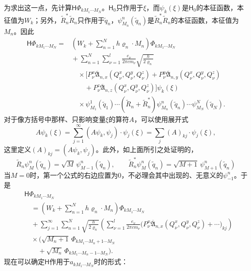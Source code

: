 \documentclass[fontsize=13pt,twoside,openany,headings=normal,parskip=false,bookmarkpackage=false,DIV=calc]{scrbook}
\begin{document}
为求出这一点，先计算$\mathsf{H}\Phi_{kM_1\cdots M_N}$。$\mathsf{H}_0$只作用于$\xi$，而$\psi_k(\xi)$是$\mathsf{H}_0$的本征函数，本征值为$W_k$；另外，$\widetilde R_n^*\widetilde R_n$只作用于$\widetilde q_n$，$\psi_{M_n}^n(\widetilde q_n)$是$\widetilde R_n^*\widetilde R_n$的本征函数，本征值为$M_n$。\hypertarget{origpage-143}{}\label{origpage-143}因此
\begin{align*}
 \mathsf{H}\Phi_{kM_1\cdots M_N}
 ={}&\left(W_k+\sum_{n=1}^{N}h\varrho_n\cdot M_n\right)\Phi_{kM_1\cdots M_N}\\
 &{}+\sum_{n=1}^{N}\sum_{\nu=1}^{l}\frac{e_\nu}{2\pi cm_\nu}\sqrt{\frac h{2\varrho_n}}\\
 &\quad{}\times\bigl[P_\nu^x\overline{\mathfrak A}_{n,x}(Q_\nu^x,Q_\nu^y,Q_\nu^z)
 +P_\nu^y\overline{\mathfrak A}_{n,y}(Q_\nu^x,Q_\nu^y,Q_\nu^z)\\
 &\qquad{}+P_\nu^z\overline{\mathfrak A}_{n,z}(Q_\nu^x,Q_\nu^y,Q_\nu^z)\bigr]\psi_k(\xi)\\
 &\quad{}\times\psi_{M_1}^1(\widetilde q_1)\cdots
 (\widetilde R_n+\widetilde R_n^*)\psi_{M_n}^n(\widetilde q_n)\cdots\psi_{M_N}^N(\widetilde q_N).
\end{align*}
对于像方括号中那样、只影响变量$\xi$的算符$A$，可以使用展开式
\[
 A\psi_k(\xi)=\sum_{j=1}^{\infty}(A\psi_k,\psi_j)\cdot\psi_j(\xi)
 =\sum_j(A)_{kj}\cdot\psi_j(\xi),
\]
这里定义$(A)_{kj}=(A\psi_k,\allowbreak \psi_j)$。此外，如上面所引之处证明的，
\[
 \widetilde R_n\psi_M^n(\widetilde q_n)=\sqrt M\,\psi_{M-1}^n(\widetilde q_n),\qquad
 \widetilde R_n^*\psi_M^n(\widetilde q_n)=\sqrt{M+1}\,\psi_{M+1}^n(\widetilde q_n)
\]
当$M=0$时，第一个公式的右边应置为$0$，不必理会其中出现的、无意义的$\psi_{-1}^n$。于是
\begin{align*}
 &\mathsf{H}\Phi_{kM_1\cdots M_N}\\
 &\quad=\left(W_k+\sum_{n=1}^{N}h\varrho_n\cdot M_n\right)\Phi_{kM_1\cdots M_N}\\
 &\quad{}+\sum_{j=1}^{\infty}\sum_{n=1}^{N}\sqrt{\frac h{2\varrho_n}}
 \left(\sum_{\nu=1}^{l}\frac{e_\nu}{2\pi cm_\nu}
 \bigl(P_\nu^x\overline{\mathfrak A}_{n,x}(Q_\nu^x,Q_\nu^y,Q_\nu^z)+\cdots\bigr)_{kj}\right)\\
 &\quad{}\times\bigl(\sqrt{M_n+1}\,\Phi_{kM_1\cdots M_n+1\cdots M_N}\\
 &\qquad{}+\sqrt{M_n}\,\Phi_{kM_1\cdots M_n-1\cdots M_N}\bigr).
\end{align*}
现在可以确定$\mathsf{H}$作用于$a_{kM_1\cdots M_N}$时的形式：
\end{document}
